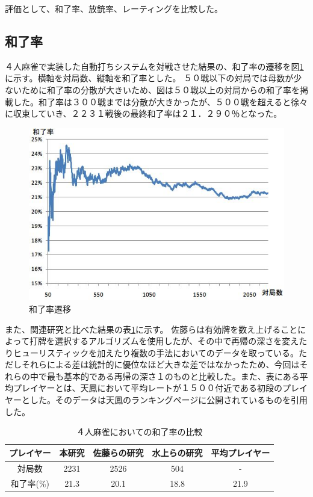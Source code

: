 評価として、和了率、放銃率、レーティングを比較した。


\subsection{和了率}
４人麻雀で実装した自動打ちシステムを対戦させた結果の、和了率の遷移を図\ref{houra2231}に示す。横軸を対局数、縦軸を和了率とした。
５０戦以下の対局では母数が少ないために和了率の分散が大きいため、図は５０戦以上の対局からの和了率を掲載した。和了率は３００戦までは分散が大きかったが、５００戦を超えると徐々に収束していき、２２３１戦後の最終和了率は２１．２９０％となった。

\begin{figure}[h]
 \centering
 \includegraphics[keepaspectratio, scale=0.8,bb=0 0 546 369]
      {img/houra2231.jpg}
 \caption{和了率遷移}
 \label{houra2231}
\end{figure}

また、関連研究と比べた結果の表\ref{tb:houraritu}に示す。
佐藤らは有効牌を数え上げることによって打牌を選択するアルゴリズムを使用したが、その中で再帰の深さを変えたりヒューリスティックを加えたり複数の手法においてのデータを取っている。ただしそれらによる差は統計的に優位なほど大きな差ではなかったため、今回はそれらの中で最も基本的である再帰の深さ１のものと比較した。また、表にある平均プレイヤーとは、天鳳において平均レートが１５００付近である初段のプレイヤーとした。そのデータは天鳳\cite{tenhou}のランキングページに公開されているものを引用した。

\begin{table}[h]
  \caption{４人麻雀においての和了率の比較}
  \label{tb:houraritu}
  \begin{center}
  \begin{tabular}{c||c|c|c|c}
    \hline
    プレイヤー   & 本研究 & 佐藤らの研究 & 水上らの研究 & 平均プレイヤー\\\hline\hline
    対局数   & 2231 & 2526 & 504 & -\\\hline
    和了率(\%) & 21.3 & 20.1 & 18.8 & 21.9\\\hline
  \end{tabular}\end{center}
\end{table}

